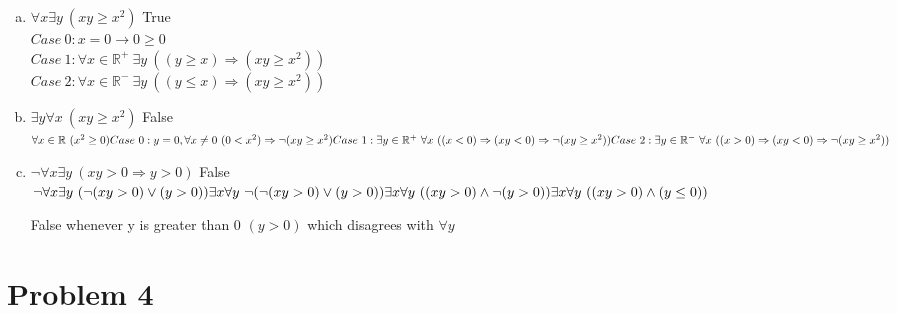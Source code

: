 \documentclass[11pt,letterpaper]{article}
\begin{document}
\begin{enumerate}[(a)]
\item $\forall x \exists y ~(xy\geq x^2)$ True\\
$Case~0: x = 0 \rightarrow 0\geq 0$\\
$Case~1: \forall x\in \mathbb{R}^{+}~\exists y
~((y\geq x)\Rightarrow (xy\geq x^2))$\\
$Case~2: \forall x\in \mathbb{R}^{-}~\exists y
~((y\leq x)\Rightarrow (xy\geq x^2))$
\item $\exists y\forall x ~(xy\geq x^2)$ False\\
$\forall x\in\mathbb{R}~(x^2\geq 0)\\
Case~0: y=0,\forall x\neq0~(0 < x^2)\Rightarrow\neg(xy\geq x^2)~ \\
Case~1: \exists y\in\mathbb{R}^+~\forall x\
((x<0)\Rightarrow (xy < 0)\Rightarrow\neg(xy\geq x^2))\\
Case~2: \exists y\in\mathbb{R}^-~\forall x\
((x>0)\Rightarrow (xy <0)\Rightarrow\neg(xy\geq x^2))\\$
\item $\neg\forall x\exists y~ (xy>0\Rightarrow y>0)$ False\\
$\neg\forall x\exists y~(\neg(xy>0)\vee(y>0))\\
\exists x\forall y~ \neg(\neg(xy>0)\vee(y>0))\\
\exists x\forall y~ ((xy>0)\wedge\neg(y>0))\\
\exists x\forall y~ ((xy>0)\wedge(y\leq0))\\$
\smallskip

False whenever y is greater than 0 $(y>0)$ which disagrees with $\forall y$

\end{enumerate}
\clearpage

\section*{Problem 4}
\end{document}
